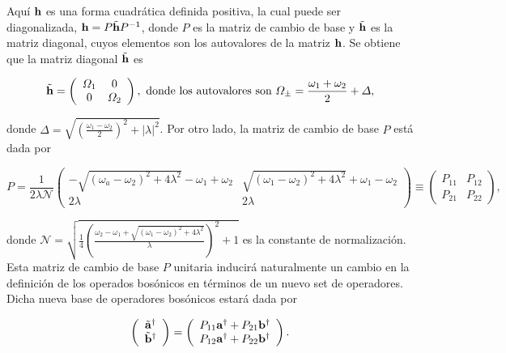 \documentclass{report} %
\numberwithin{equation}{section}
\begin{document}
Aquí ${\bf h}$ es una forma cuadrática definida positiva, la cual puede ser diagonalizada, ${\bf h} = P\tilde{\bf h}P^{-1}$, donde $P$ es la matriz de cambio de base y $\tilde{{\bf h}}$ es la matriz diagonal, cuyos elementos son los autovalores de la matriz ${\bf h}$. Se obtiene que la matriz diagonal $\tilde{\bf h}$ es


\begin{equation}
    \tilde{\bf h} = \left(\begin{array}{cc}
    \Omega_1 & 0  \\
    0 &  \Omega_2
    \end{array}\right), \textnormal{ donde los autovalores son } \Omega_{\pm} = \frac{\omega_1 + \omega_2}{2} + \Delta,  
\end{equation}

donde $\Delta =\sqrt{\left(\frac{\omega_1-\omega_2}{2}\right)^2 + |\lambda|^2}$. Por otro lado, la matriz de cambio de base $P$ está dada por

\begin{equation}
    P = \frac{1}{2\lambda\mathcal{N}} \left(\begin{array}{cc}
        -{\sqrt{(\omega_a - \omega_2)^2+4\lambda^2}-\omega_1 + \omega_2} &  {\sqrt{(\omega_1 - \omega_2)^2+4\lambda^2}+\omega_1 - \omega_2}\\
      {2\lambda}  & {2\lambda}
    \end{array}\right) \equiv \left(\begin{array}{cc}
        P_{11} & P_{12} \\
        P_{21} & P_{22}
    \end{array}\right),
\end{equation}

donde $\mathcal{N} = \sqrt{\frac{1}{4}\left(\frac{\omega_2 - \omega_1 +\sqrt{(\omega_1 - \omega_2)^2+4\lambda^2}}{\lambda}\right)^2 + 1} $ es la constante de normalización. Esta matriz de cambio de base $P$ unitaria inducirá naturalmente un cambio en la definición de los operados bosónicos en términos de un nuevo set de operadores. Dicha nueva base de operadores bosónicos estará dada por 


\begin{equation}
     \left( \begin{array}{c}
        \tilde{\bf a}^{\dagger} \\
         \tilde{\mathbf b}^{\dagger} 
    \end{array} \right) = \left(\begin{array}{c}
        P_{11} {\bf a}^{\dagger} +  P_{21}{\mathbf b}^{\dagger} \\
        P_{12} {\bf a}^{\dagger} + P_{22} {\mathbf b}^{\dagger}
    \end{array}\right).
    \label{model3.1_new basis}
\end{equation}
\end{document}
